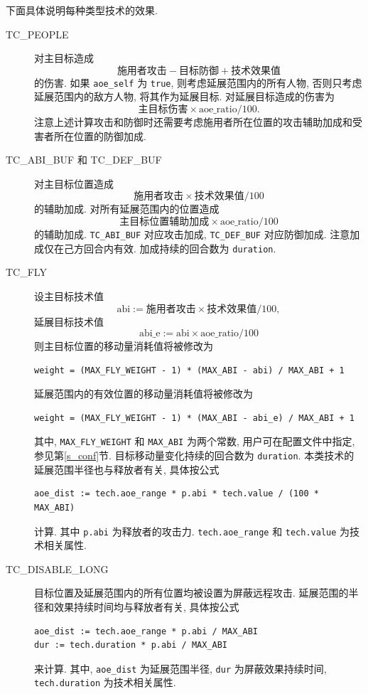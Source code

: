 \documentclass[UTF8, zihao=-4]{ctexart} %
\newcommand{\lcode}{\lstinline} % 段内插入代码
\begin{document}
下面具体说明每种类型技术的效果. 
\begin{description}
      \item [TC\_PEOPLE] 
            对主目标造成 $$ \text{施用者攻击} - \text{目标防御} + \text{技术效果值} $$ 的伤害.
            如果 \lcode{aoe_self} 为 \lcode{true}, 则考虑延展范围内的所有人物, 
            否则只考虑延展范围内的敌方人物, 将其作为延展目标.
            对延展目标造成的伤害为 $$ \text{主目标伤害} \times \text{aoe\_ratio} / 100. $$
            注意上述计算攻击和防御时还需要考虑施用者所在位置的攻击辅助加成和受害者所在位置的防御加成.
      \item [TC\_ABI\_BUF 和 TC\_DEF\_BUF]
            对主目标位置造成 $$ \text{施用者攻击} \times \text{技术效果值} / 100 $$ 的辅助加成.
            对所有延展范围内的位置造成 $$ \text{主目标位置辅助加成} \times \text{aoe\_ratio} / 100 $$ 的辅助加成.
            \lcode{TC_ABI_BUF} 对应攻击加成, \lcode{TC_DEF_BUF} 对应防御加成. 注意加成仅在己方回合内有效.
            加成持续的回合数为 \lcode{duration}.
      \item [TC\_FLY]
            设主目标技术值 $$ \text{abi} := \text{施用者攻击} \times \text{技术效果值} / 100, $$ 
            延展目标技术值 $$ \text{abi\_e} := \text{abi} \times \text{aoe\_ratio} / 100 $$
            则主目标位置的移动量消耗值将被修改为
            \begin{lstlisting}
weight = (MAX_FLY_WEIGHT - 1) * (MAX_ABI - abi) / MAX_ABI + 1
            \end{lstlisting}
            延展范围内的有效位置的移动量消耗值将被修改为
            \begin{lstlisting}
weight = (MAX_FLY_WEIGHT - 1) * (MAX_ABI - abi_e) / MAX_ABI + 1
            \end{lstlisting}
            其中, \lcode{MAX_FLY_WEIGHT} 和 \lcode{MAX_ABI} 为两个常数, 用户可在配置文件中指定, 参见第\ref{s_conf}节.
            目标移动量变化持续的回合数为 \lcode{duration}.
            本类技术的延展范围半径也与释放者有关, 具体按公式
            \begin{lstlisting}
aoe_dist := tech.aoe_range * p.abi * tech.value / (100 * MAX_ABI)
            \end{lstlisting}
            计算. 其中 \lcode{p.abi} 为释放者的攻击力. \lcode{tech.aoe_range} 和 \lcode{tech.value} 为技术相关属性.
      \item [TC\_DISABLE\_LONG] 
            目标位置及延展范围内的所有位置均被设置为屏蔽远程攻击. 
            延展范围的半径和效果持续时间均与释放者有关, 具体按公式
            \begin{lstlisting}
aoe_dist := tech.aoe_range * p.abi / MAX_ABI
dur := tech.duration * p.abi / MAX_ABI
            \end{lstlisting}
            来计算. 其中, \lcode{aoe_dist} 为延展范围半径, \lcode{dur} 为屏蔽效果持续时间, \lcode{tech.duration} 为技术相关属性.
\end{description}
\end{document}
